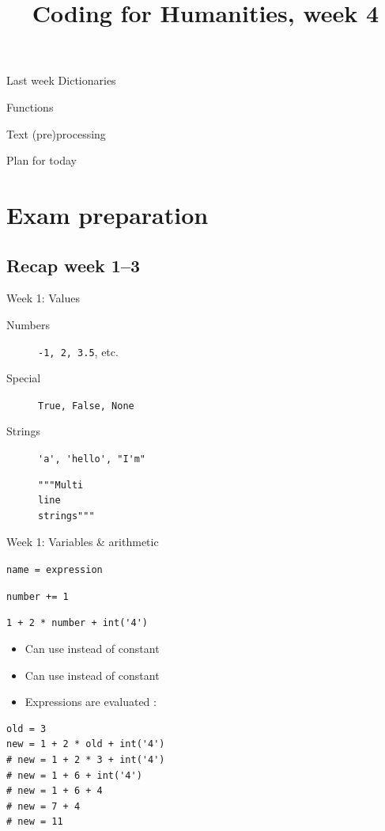 \documentclass[aspectratio=169,usenames,dvipsnames]{beamer}
\title{Coding for Humanities, week 4}
\begin{document}
\begin{frame}
 \titlepage
\end{frame}

\begin{frame}{Last week}
    \large
    Dictionaries

    \vspace{1em}
    Functions

    \vspace{1em}
    Text (pre)processing
\end{frame}

\begin{frame}{Plan for today}
 \tableofcontents
\end{frame}

\section{Exam preparation}
\frame{\tableofcontents[currentsection]}

\subsection{Recap week 1--3}
\begin{frame}[fragile]{Week 1: Values}
    \begin{description}
        \item[Numbers] \lstinline{-1, 2, 3.5}, etc.
        \item[Special] \lstinline{True, False, None}
        \item[Strings] \lstinline{'a', 'hello', "I'm"}
\begin{lstlisting}
"""Multi
line
strings"""
\end{lstlisting}
    \end{description}
\end{frame}

\begin{frame}[fragile]{Week 1: Variables \& arithmetic}
    \begin{description}[Assignment]
        \item[Assignment] \lstinline{name = expression}
        \item[Increment] \lstinline{number += 1}
        \item[Expressions] \lstinline{1 + 2 * number + int('4')}
    \end{description}
    \pause
    \begin{itemize}
        \item Can use  instead of constant
        \item Can use  instead of constant
        \item Expressions are evaluated :
    \end{itemize}
\begin{lstlisting}
old = 3
new = 1 + 2 * old + int('4')
# new = 1 + 2 * 3 + int('4')
# new = 1 + 6 + int('4')
# new = 1 + 6 + 4
# new = 7 + 4
# new = 11
\end{lstlisting}
\end{frame}
\end{document}
